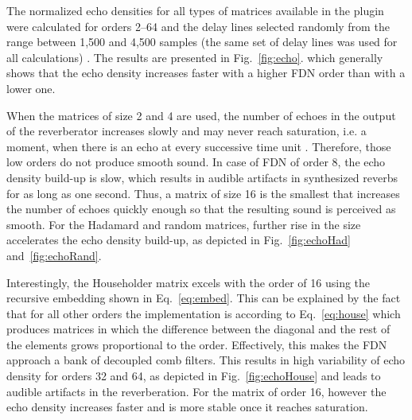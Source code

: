 \documentclass[twoside,a4paper]{article}
\begin{document}
The normalized echo densities for all types of matrices available in the plugin were calculated for orders 2--64 and the delay lines selected randomly %
from the range between 1,500 and 4,500 samples (the same set of delay lines was used for all calculations) \cite{abel:2006, huang:2007, huang:2008}. The results are presented in Fig.~\ref{fig:echo}. which generally shows that the echo density increases faster with a higher FDN order than with a lower one. 

When the matrices of size 2 and 4 are used, the number of echoes in the output of the reverberator increases slowly and may never reach saturation, i.e. a moment, when there is an echo at every successive time unit \cite{schlecht:2016:echo}. Therefore, those low orders do not produce smooth sound. In case of FDN of order 8, the echo density build-up is slow, which results in audible artifacts in synthesized reverbs for as long as one second. Thus, a matrix of size 16 is the smallest that increases the number of echoes quickly enough so that the resulting sound is perceived as smooth. For the Hadamard and random matrices, further rise in the size accelerates the echo density build-up, as depicted in Fig.~\ref{fig:echoHad} and~\ref{fig:echoRand}.

Interestingly, the Householder matrix excels with the order of 16 using the recursive embedding shown in Eq.~\eqref{eq:embed}. This can be explained by the fact that for all other orders the implementation is according to Eq.~\eqref{eq:house} which produces matrices in which the difference between the diagonal and the rest of the elements grows proportional to the order. Effectively, this makes the FDN approach a bank of decoupled comb filters. This results in high variability of echo density for orders 32 and 64, as depicted in Fig.~\ref{fig:echoHouse} and leads to audible artifacts in the reverberation. For the matrix of order 16, however the echo density increases faster and is more stable once it reaches saturation.
\end{document}
